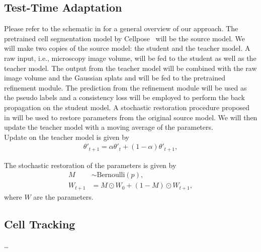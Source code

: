 \subsection{Test-Time Adaptation}
Please refer to the schematic in  for a general overview of our approach. The pretrained cell segmentation model by Cellpose~\cite{stringer2021cellpose} will be the source model. We will make two copies of the source model: the student and the teacher model. A raw input, i.e., microscopy image volume, will be fed to the student as well as the teacher model. The output from the teacher model will be combined with the raw image volume and the Gaussian splats and will be fed to the pretrained refinement module. The prediction from the refinement module will be used as the pseudo labels and a consistency loss will be employed to perform the back propagation on the student model. A stochastic restoration procedure proposed in \cite{wang2022continual} will be used to restore parameters from the original source model. We will then update the teacher model with a moving average of the parameters.    \\


Update on the teacher model is given by
\begin{align}
    \theta'_{t+1} = \alpha \theta'_{t} + (1-\alpha)\theta'_{t+1},
\end{align}


The stochastic restoration of the parameters is given by
\begin{align}
    M &\sim \text{Bernoulli}(p), \\
    W_{t+1} &= M \odot W_0 + (1-M) \odot W_{t+1}, 
\end{align}
where $W$ are the parameters. \\



\subsection{Cell Tracking}
\dots